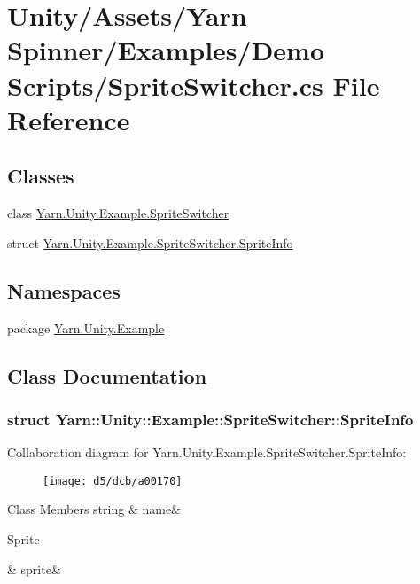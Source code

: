 \hypertarget{a00114}{\section{Unity/\-Assets/\-Yarn Spinner/\-Examples/\-Demo Scripts/\-Sprite\-Switcher.cs File Reference}
\label{a00114}
}
\subsection*{Classes}
\begin{DoxyCompactItemize}
\item 
class \hyperlink{a00073}{Yarn.\-Unity.\-Example.\-Sprite\-Switcher}
\item 
struct \hyperlink{a00073_d9/d38/a00166}{Yarn.\-Unity.\-Example.\-Sprite\-Switcher.\-Sprite\-Info}
\end{DoxyCompactItemize}
\subsection*{Namespaces}
\begin{DoxyCompactItemize}
\item 
package \hyperlink{a00156}{Yarn.\-Unity.\-Example}
\end{DoxyCompactItemize}


\subsection{Class Documentation}
\label{d9/d38/a00166}
\hypertarget{a00073_d9/d38/a00166}{}
\subsubsection{struct Yarn\-:\-:Unity\-:\-:Example\-:\-:Sprite\-Switcher\-:\-:Sprite\-Info}


Collaboration diagram for Yarn.\-Unity.\-Example.\-Sprite\-Switcher.\-Sprite\-Info\-:
\nopagebreak
\begin{figure}[H]
\begin{center}
\leavevmode
\texttt{[image: d5/dcb/a00170]}
\end{center}
\end{figure}
\begin{DoxyFields}{Class Members}
\hypertarget{a00073_a3f5bca2fff413dfe075c1fcf7e58369c}{string}\label{a00073_a3f5bca2fff413dfe075c1fcf7e58369c}
&
name&
\\
\hline

\hypertarget{a00073_adc58df011dc2841837b6cf775b372061}{Sprite}\label{a00073_adc58df011dc2841837b6cf775b372061}
&
sprite&
\\
\hline

\end{DoxyFields}
